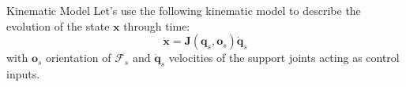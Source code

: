\documentclass[10pt]{beamer}
\begin{document}
\begin{frame}{Kinematic Model}
        Let's use the following kinematic model to describe the
        evolution of the state $\bm{x}$ through time:
        \begin{equation*}
            \bm{\dot{x}} = \bm{J}(\bm{q}_s, \bm{o}_s) \bm{\dot{q}}_s
        \end{equation*}
        with $\bm{o}_s$ orientation of $\mathcal{F}_s$ and
        $\bm{\dot{q}}_s$ velocities of the support joints
        acting as control inputs.

\end{frame}
\end{document}
